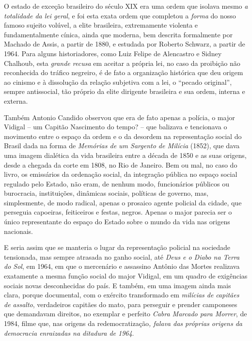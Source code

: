 O estado de exceção brasileiro do século XIX era uma ordem que isolava
mesmo \emph{a totalidade da lei geral}, e foi esta exata ordem que
completou a \emph{forma} do nosso famoso sujeito volúvel, a elite
brasileira, extremamente violenta e fundamentalmente cínica, ainda que
moderna, bem descrita formalmente por Machado de Assis, a partir de
1880, e estudada por Roberto Schwarz, a partir de 1964. Para alguns
historiadores, como Luiz Felipe de Alencastro e Sidney Chalhoub, esta
\emph{grande recusa} em aceitar a própria lei, no caso da proibição não
reconhecida do tráfico negreiro, é de fato a organização histórica que
deu origem ao cinismo e à dissolução da relação subjetiva com a lei, o
``pecado original'', sempre antissocial, tão próprio da elite dirigente
brasileira e sua ordem, interna e externa.

Também Antonio Candido observou que era de fato apenas a polícia, o
major Vidigal -- um Capitão Nascimento do tempo? -- que balizava e
tencionava o movimento entre o espaço da ordem e o da desordem na
representação social do Brasil dada na forma de \emph{Memórias de um
Sargento de Milícia} (1852), que dava uma imagem dialética da vida
brasileira entre a década de 1850 e as suas origens, desde a chegada da
corte em 1808, no Rio de Janeiro. Bem ou mal, no caso do livro, os
emissários da ordenação social, da integração pública no espaço social
regulado pelo Estado, não eram, de nenhum modo, funcionários públicos ou
burocracia, instituições, dinâmicas sociais, políticas de governo, mas,
simplesmente, de modo radical, apenas o prosaico agente policial da
cidade, que perseguia capoeiras, feiticeiros e festas, negros. Apenas o
major parecia ser o único representante do espaço do Estado sobre o
mundo da vida nas origens nacionais.

E seria assim que se manteria o lugar da representação policial na
sociedade tensionada, mas sempre atrasada no ganho social, até
\emph{Deus e o Diabo na Terra do Sol}, em 1964, em que o mercenário e
assassino Antônio das Mortes realizava exatamente a mesma função social
do major Vidigal, em um quadro de exigências sociais novas desconhecidas
do país. E também, em uma imagem ainda mais clara, porque documental,
com o exército transformado em \emph{milícias de} \emph{capitães de
assalto}, verdadeiros capitães do mato, para perseguir e prender
camponeses que demandavam direitos, no exemplar e perfeito \emph{Cabra
Marcado para Morrer}, de 1984, filme que, nas origens da
redemocratização\emph{, falava das próprias origens da democracia
enraizadas na ditadura de 1964}.

